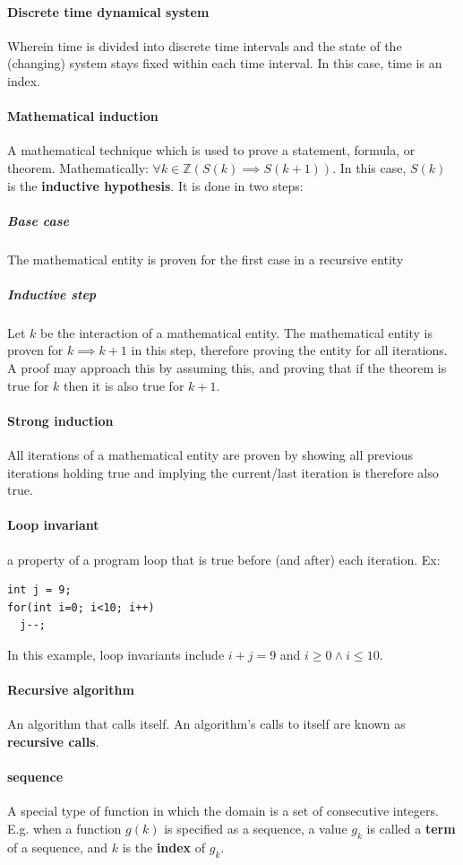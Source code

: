\documentclass[a4paper]{article}
\newcommand{\Z}{\mathbb{Z}}
\begin{document}
\paragraph{Discrete time dynamical system} Wherein time is divided into discrete time intervals and the state of the (changing) system stays fixed within each time interval. In this case, time is an index.
\paragraph{Mathematical induction} A mathematical technique which is used to prove a statement, formula, or theorem. Mathematically: $\forall k \in \Z (S(k) \implies S(k+1))$. In this case, $S(k)$ is the \textbf{inductive hypothesis}. It is done in two steps:
\subparagraph{Base case} The mathematical entity is proven for the first case in a recursive entity
\subparagraph{Inductive step} Let $k$ be the interaction of a mathematical entity. The mathematical entity is proven for $k \implies k+1$ in this step, therefore proving the entity for all iterations. A proof may approach this by assuming this, and proving that if the theorem is true for $k$ then it is also true for $k + 1$.
\paragraph{Strong induction} All iterations of a mathematical entity are proven by showing all previous iterations holding true and implying the current/last iteration is therefore also true. 
\paragraph{Loop invariant}a property of a program loop that is true before (and after) each iteration. Ex:
\begin{lstlisting}
int j = 9;
for(int i=0; i<10; i++)  
  j--;
\end{lstlisting}
In this example, loop invariants include $i + j = 9$ and $i \geq 0 \land i \leq 10$.
\paragraph{Recursive algorithm} An algorithm that calls itself. An algorithm's calls to itself are known as \textbf{recursive calls}. 
\paragraph{sequence} A special type of function in which the domain is a set of consecutive integers. E.g. when a function $g(k)$ is specified as a sequence, a value $g_k$ is called a \textbf{term} of a sequence, and $k$ is the \textbf{index} of $g_k$.
\end{document}

